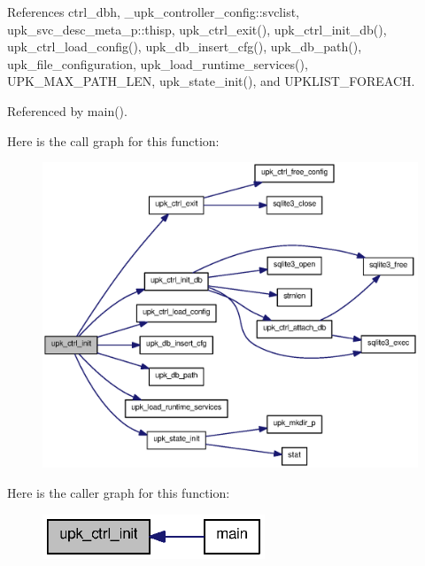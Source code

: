 References ctrl\_\-dbh, \_\-upk\_\-controller\_\-config::svclist, upk\_\-svc\_\-desc\_\-meta\_\-p::thisp, upk\_\-ctrl\_\-exit(), upk\_\-ctrl\_\-init\_\-db(), upk\_\-ctrl\_\-load\_\-config(), upk\_\-db\_\-insert\_\-cfg(), upk\_\-db\_\-path(), upk\_\-file\_\-configuration, upk\_\-load\_\-runtime\_\-services(), UPK\_\-MAX\_\-PATH\_\-LEN, upk\_\-state\_\-init(), and UPKLIST\_\-FOREACH.



Referenced by main().



Here is the call graph for this function:
\nopagebreak
\begin{figure}[H]
\begin{center}
\leavevmode
\includegraphics[width=400pt]{controller_2controller_8c_a253734ff940e671ba2bd35fc159a9471_cgraph}
\end{center}
\end{figure}




Here is the caller graph for this function:\nopagebreak
\begin{figure}[H]
\begin{center}
\leavevmode
\includegraphics[width=188pt]{controller_2controller_8c_a253734ff940e671ba2bd35fc159a9471_icgraph}
\end{center}
\end{figure}


